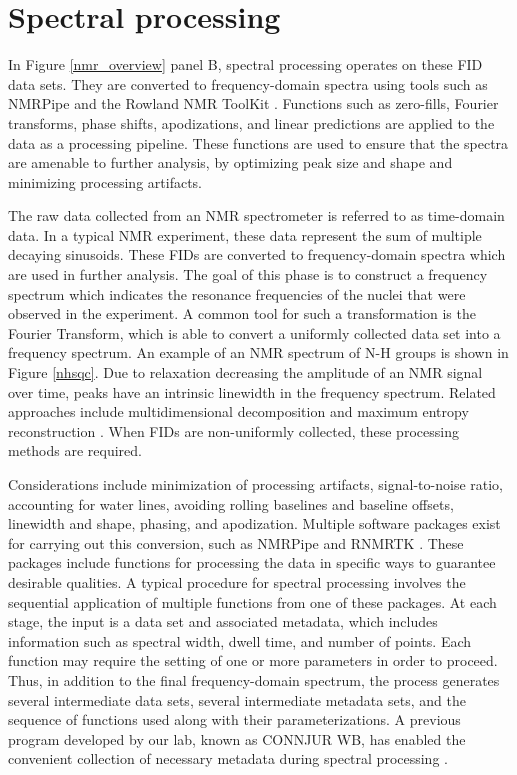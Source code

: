 \section{Spectral processing}

In Figure \ref{nmr_overview} panel B, 
spectral processing operates on these FID data sets.  They are 
converted to frequency-domain spectra using tools such as NMRPipe \cite{nmrpipe}
and the Rowland NMR ToolKit \cite{rnmrtk}.  Functions such as 
zero-fills, Fourier transforms, phase shifts, apodizations, and linear 
predictions are applied to the data as a processing pipeline.  These 
functions are used to ensure that the spectra are amenable to further 
analysis, by optimizing peak size and shape and minimizing processing 
artifacts.

The raw data collected from an NMR spectrometer is referred to as 
time-domain data.  In a typical NMR experiment, these data represent the 
sum of multiple decaying sinusoids.  These FIDs are converted to 
frequency-domain spectra which are used in further analysis.  The goal of 
this phase is to construct a frequency spectrum which indicates the resonance 
frequencies of the nuclei that were observed in the experiment.  A common tool 
for such a transformation is the Fourier Transform, which is able to convert 
a uniformly collected data set into a frequency spectrum.  
An example of an NMR spectrum of N-H groups is shown in Figure \ref{nhsqc}.
Due to relaxation decreasing the amplitude of an NMR signal over time, peaks 
have an intrinsic linewidth in the frequency spectrum.
Related approaches include multidimensional decomposition \cite{mdd}
and maximum entropy reconstruction \cite{hoch1996nmr}.  When FIDs are 
non-uniformly collected, these processing methods are required.

Considerations include minimization of processing artifacts, signal-to-noise 
ratio, accounting for water lines, avoiding rolling baselines and baseline 
offsets, linewidth and shape, phasing, and apodization.  Multiple software 
packages exist for carrying out this conversion, such as NMRPipe and RNMRTK \cite{nmrpipe, rnmrtk}.
These packages include functions for processing the data in specific ways to 
guarantee desirable qualities.  A typical procedure for spectral processing 
involves the sequential application of multiple functions from one of these 
packages.  At each stage, the input is a data set and associated metadata, 
which includes information such as spectral width, dwell time, and number of 
points.  Each function may require the setting of one or more parameters in 
order to proceed.  Thus, in addition to the final frequency-domain spectrum, 
the process generates several intermediate data sets, several 
intermediate metadata sets, and the sequence of functions used along with 
their parameterizations.  A previous program developed by our lab, known
as CONNJUR WB, has enabled the convenient collection of necessary metadata 
during spectral processing \cite{connjur-wb}.



